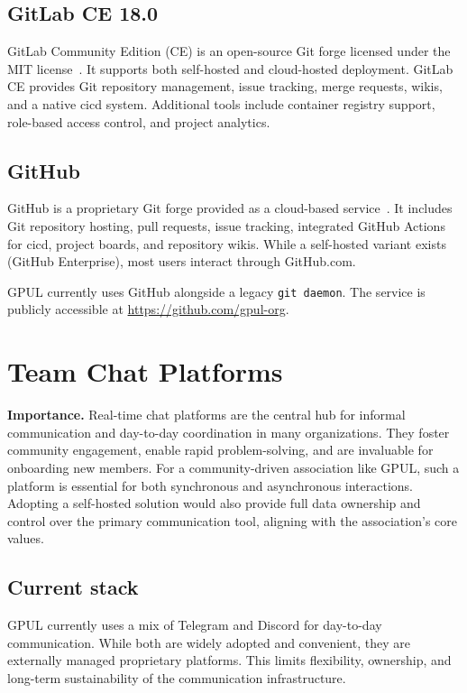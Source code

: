 \subsection*{GitLab CE 18.0}

GitLab Community Edition (CE) is an open-source Git forge licensed under the MIT license~\cite{gitlab-docs}. It supports both self-hosted and cloud-hosted deployment. GitLab CE provides Git repository management, issue tracking, merge requests, wikis, and a native \gls{cicd} system. Additional tools include container registry support, role-based access control, and project analytics.

\subsection*{GitHub}

GitHub is a proprietary Git forge provided as a cloud-based service~\cite{github-docs}. It includes Git repository hosting, pull requests, issue tracking, integrated GitHub Actions for \gls{cicd}, project boards, and repository wikis. While a self-hosted variant exists (GitHub Enterprise), most users interact through GitHub.com.

GPUL currently uses GitHub alongside a legacy \texttt{git daemon}. The service is publicly accessible at \url{https://github.com/gpul-org}.

\section{Team Chat Platforms}

\textbf{Importance.} Real-time chat platforms are the central hub for informal communication and day-to-day coordination in many organizations. They foster community engagement, enable rapid problem-solving, and are invaluable for onboarding new members. For a community-driven association like GPUL, such a platform is essential for both synchronous and asynchronous interactions. Adopting a self-hosted solution would also provide full data ownership and control over the primary communication tool, aligning with the association's core values.

\subsection*{Current stack}

GPUL currently uses a mix of Telegram and Discord for day-to-day communication. While both are widely adopted and convenient, they are externally managed proprietary platforms. This limits flexibility, ownership, and long-term sustainability of the communication infrastructure.

